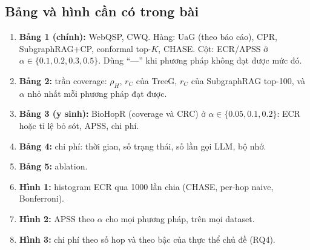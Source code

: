 \documentclass[11pt,a4paper]{article}
\theoremstyle{remark}
\newcommand{\method}{\textsc{CHASE}}
\begin{document}
\subsection{Bảng và hình cần có trong bài}
\begin{enumerate}[nosep]
  \item \textbf{Bảng 1 (chính):} WebQSP, CWQ. Hàng: UaG (theo báo cáo), CPR, SubgraphRAG+CP, conformal top-$K$, \method. Cột: ECR/APSS ở $\alpha\in\{0.1,0.2,0.3,0.5\}$. Dùng ``---'' khi phương pháp không đạt được mức đó.
  \item \textbf{Bảng 2:} trần coverage: $\rho_H$, $r_C$ của TreeG, $r_C$ của SubgraphRAG top-100, và $\alpha$ nhỏ nhất mỗi phương pháp đạt được.
  \item \textbf{Bảng 3 (y sinh):} BioHopR (coverage và CRC) ở $\alpha\in\{0.05,0.1,0.2\}$: ECR hoặc tỉ lệ bỏ sót, APSS, chi phí.
  \item \textbf{Bảng 4:} chi phí: thời gian, số trạng thái, số lần gọi LLM, bộ nhớ.
  \item \textbf{Bảng 5:} ablation.
  \item \textbf{Hình 1:} histogram ECR qua 1000 lần chia (\method, per-hop naive, Bonferroni).
  \item \textbf{Hình 2:} APSS theo $\alpha$ cho mọi phương pháp, trên mọi dataset.
  \item \textbf{Hình 3:} chi phí theo số hop và theo bậc của thực thể chủ đề (RQ4).
\end{enumerate}
\end{document}
